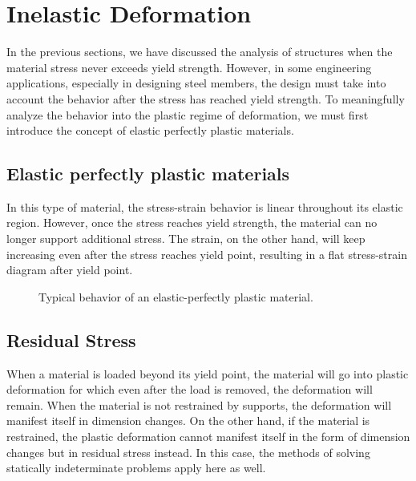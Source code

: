 \documentclass[
10pt,
a4paper,
openany,
svgnames,
]{book} %
\begin{document}
\section{Inelastic Deformation}

In the previous sections, we have discussed the analysis of structures when the material stress never exceeds yield strength. However, in some engineering applications, especially in designing steel members, the design must take into account the behavior after the stress has reached yield strength. To meaningfully analyze the behavior into the plastic regime of deformation, we must first introduce the concept of elastic perfectly plastic materials.

\subsection{Elastic perfectly plastic materials}

In this type of material, the stress-strain behavior is linear throughout its elastic region. However, once the stress reaches yield strength, the material can no longer support additional stress. The strain, on the other hand, will keep increasing even after the stress reaches yield point, resulting in a flat stress-strain diagram after yield point.

\begin{figure}[h]
  \centering
  \caption{Typical behavior of an elastic-perfectly plastic material.}
\end{figure}

\subsection{Residual Stress}

When a material is loaded beyond its yield point, the material will go into plastic deformation for which even after the load is removed, the deformation will remain. When the material is not restrained by supports, the deformation will manifest itself in dimension changes. On the other hand, if the material is restrained, the plastic deformation cannot manifest itself in the form of dimension changes but in residual stress instead. In this case, the methods of solving statically indeterminate problems apply here as well.
\end{document}
